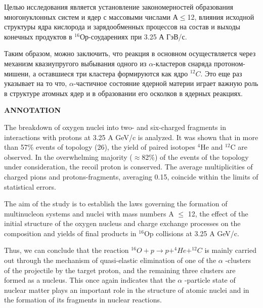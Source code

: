 \documentclass[fontsize=14pt]{scrreport}
\begin{document}
   Целью исследования является установление закономерностей образования многонуклонных систем и ядер с массовыми числами А$\le$12, влияния исходной структуры ядра кислорода и зарядообменных процессов на состав и выходы конечных продуктов в $^{16}$Ор-соударениях при 3.25 А ГэВ/с. 
    
    Таким образом, можно заключить, что реакция в основном осуществляется через механизм квазиупругого выбывания одного из $\alpha$-кластеров снаряда протоном-мишени, а оставшиеся три кластера формируются как ядро $^{12}C$. Это еще раз указывает на то что, $\alpha$-частичное состояние ядерной материи играет важную роль в структуре атомных ядер и в образовании его осколков в ядерных реакциях.
\newpage
	\thispagestyle{plain}
\begin{center}
    \large
    \textbf{ANNOTATION}\\
\end{center}
    \hspace{0.6cm}The breakdown of oxygen nuclei into two- and six-charged fragments in interactions with protons at 3.25 A GeV/c is analyzed. It was shown that in more than 57\% events of topology (26), the yield of paired isotopes $^{4}$He and $^{12}$C are observed. In the overwhelming majority ($\approx$82\%) of the events of the topology under consideration, the recoil proton is conserved. The average multiplicities of charged pions and protons-fragments, averaging 0.15, coincide within the limits of statistical errors.

   The aim of the study is to establish the laws governing the formation of multinucleon systems and nuclei with mass numbers A $\le$ 12, the effect of the initial structure of the oxygen nucleus and charge exchange processes on the composition and yields of final products in $^{16}$Op collisions at 3.25 A GeV/c. 
   
   Thus, we can conclude that the reaction $^{16}O + p \rightarrow p + ^{4}He + ^{12}C$ is mainly carried out through the mechanism of quasi-elastic elimination of one of the $ \alpha $ -clusters of the projectile by the target proton, and the remaining three clusters are formed as a nucleus. This once again indicates that the $\alpha $ -particle state of nuclear matter plays an important role in the structure of atomic nuclei and in the formation of its fragments in nuclear reactions.


	\newpage	
	\tableofcontents
	\setcounter{page}{3}
	\newpage
	
\end{document}
